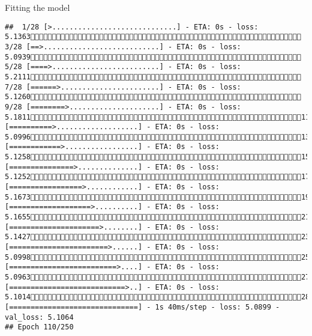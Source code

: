 \documentclass[
  ignorenonframetext,
]{beamer}
\begin{document}
\begin{frame}[fragile]{Fitting the model}
\begin{verbatim}
##  1/28 [>.............................] - ETA: 0s - loss: 5.1363 3/28 [==>...........................] - ETA: 0s - loss: 5.0939 5/28 [====>.........................] - ETA: 0s - loss: 5.2111 7/28 [======>.......................] - ETA: 0s - loss: 5.1260 9/28 [========>.....................] - ETA: 0s - loss: 5.181111/28 [==========>...................] - ETA: 0s - loss: 5.099613/28 [============>.................] - ETA: 0s - loss: 5.125815/28 [===============>..............] - ETA: 0s - loss: 5.125217/28 [=================>............] - ETA: 0s - loss: 5.167319/28 [===================>..........] - ETA: 0s - loss: 5.165521/28 [=====================>........] - ETA: 0s - loss: 5.142723/28 [=======================>......] - ETA: 0s - loss: 5.099825/28 [=========================>....] - ETA: 0s - loss: 5.096327/28 [===========================>..] - ETA: 0s - loss: 5.101428/28 [==============================] - 1s 40ms/step - loss: 5.0899 - val_loss: 5.1064
## Epoch 110/250

\end{verbatim}
\end{frame}
\end{document}
